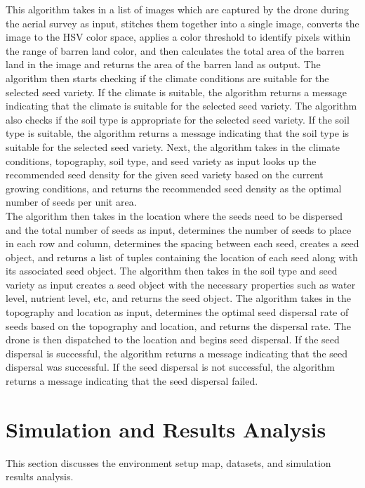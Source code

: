 \documentclass[conference]{IEEEtran}
\begin{document}
 This algorithm takes in a list of images which are captured by the drone during the aerial survey as input, stitches them together into a single image, converts the image to the HSV color space, applies a color threshold to identify pixels within the range of barren land color, and then calculates the total area of the barren land in the image and returns the area of the barren land as output. The algorithm then starts checking if the climate conditions are suitable for the selected seed variety. If the climate is suitable, the algorithm returns a message indicating that the climate is suitable for the selected seed variety. The algorithm also checks if the soil type is appropriate for the selected seed variety. If the soil type is suitable, the algorithm returns a message indicating that the soil type is suitable for the selected seed variety. Next, the algorithm takes in the climate conditions, topography, soil type, and seed variety as input looks up the recommended seed density for the given seed variety based on the current growing conditions, and returns the recommended seed density as the optimal number of seeds per unit area. 
\\The algorithm then takes in the location where the seeds need to be dispersed and the total number of seeds as input, determines the number of seeds to place in each row and column, determines the spacing between each seed, creates a seed object, and returns a list of tuples containing the location of each seed along with its associated seed object. The algorithm then takes in the soil type and seed variety as input creates a seed object with the necessary properties such as water level, nutrient level, etc, and returns the seed object. The algorithm takes in the topography and location as input, determines the optimal seed dispersal rate of seeds based on the topography and location, and returns the dispersal rate. The drone is then dispatched to the location and begins seed dispersal. If the seed dispersal is successful, the algorithm returns a message indicating that the seed dispersal was successful. If the seed dispersal is not successful, the algorithm returns a message indicating that the seed dispersal failed.

\section{Simulation and Results Analysis}
This section discusses the environment setup map, datasets, and simulation results analysis.
\end{document}
